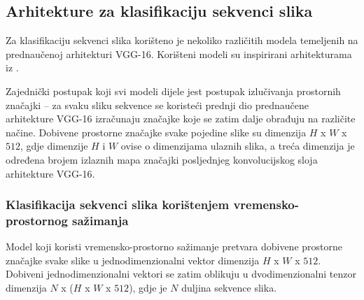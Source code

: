 \documentclass[times, utf8, diplomski, numeric]{fer}
\begin{document}
\subsection{Arhitekture za klasifikaciju sekvenci slika}
Za klasifikaciju sekvenci slika korišteno je nekoliko različitih modela temeljenih na prednaučenoj arhitekturi VGG-16. 
Korišteni modeli su inspirirani arhitekturama iz \citep{article:sequential_architectures}.

Zajednički postupak koji svi modeli dijele jest postupak izlučivanja prostornih značajki -- za svaku sliku sekvence se koristeći prednji dio prednaučene arhitekture VGG-16 izračunaju značajke koje se zatim dalje obrađuju na različite načine.
Dobivene prostorne značajke svake pojedine slike su dimenzija $H$ x $W$ x $512$, gdje dimenzije $H$ i $W$ ovise o dimenzijama ulaznih slika, a treća dimenzija je određena brojem izlaznih mapa značajki posljednjeg konvolucijskog sloja arhitekture VGG-16. 

\subsubsection{Klasifikacija sekvenci slika korištenjem vremensko-prostornog sažimanja}
Model koji koristi vremensko-prostorno sažimanje pretvara dobivene prostorne značajke svake slike u jednodimenzionalni vektor dimenzija $H$ x $W$ x $512$.
Dobiveni jednodimenzionalni vektori se zatim oblikuju u dvodimenzionalni tenzor dimenzija $N$ x ($H$ x $W$ x $512$), gdje je $N$ duljina sekvence slika.
\end{document}
